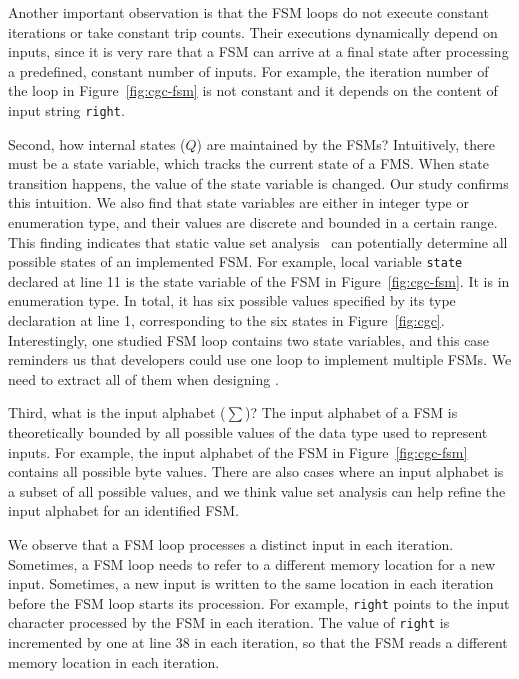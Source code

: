 Another important observation is that 
the FSM loops do not execute constant 
iterations or take constant trip counts.
Their executions dynamically depend on inputs, 
since it is very rare that a FSM can arrive at a final 
state after processing a predefined, constant number of inputs. 
For example, the iteration number of the 
loop in Figure~\ref{fig:cgc-fsm}
is not constant and it
depends on the content of input string \texttt{right}.

Second, how internal states ($Q$) are maintained by the FSMs?
Intuitively, there must be a state variable, which tracks the current state of a FMS.
When state transition happens, 
the value of the state variable is changed. 
Our study confirms this intuition. 
We also find that state variables are either in integer type or enumeration type,
and their values are discrete and bounded in a certain range. 
This finding indicates that static value set analysis~\cite{DEEPVSA,VSA} 
can potentially determine all possible states of an implemented FSM.
For example, local variable \texttt{state} declared at line 11
is the state variable of the FSM in Figure~\ref{fig:cgc-fsm}.
It is in enumeration type.
In total, it has six possible values 
specified by its type declaration at line 1, 
corresponding to the six states in Figure~\ref{fig:cgc}.
Interestingly, one studied FSM loop contains two state variables,
and this case reminders us that developers could use one loop 
to implement multiple FSMs. 
We need to extract all of them when designing \Tool{}.



Third, what is the input alphabet ($\sum$)? 
The input alphabet of a FSM is theoretically bounded by all possible values 
of the data type used to represent inputs. 
For example, the input alphabet of the FSM 
in Figure~\ref{fig:cgc-fsm} contains all possible byte values.
There are also cases where an input alphabet is a subset of all possible values, 
and we think value set analysis can help refine 
the input alphabet for an identified FSM.

We observe that a FSM loop processes a distinct input in each iteration. 
Sometimes, a FSM loop needs to refer to a different memory location for a new input. 
Sometimes, a new input is written to the same 
location in each iteration before the FSM loop starts its procession.    
For example, \texttt{right} points to the input character 
processed by the FSM in each iteration. 
The value of \texttt{right} is incremented by one at line 38 in each iteration, 
so that the FSM reads a different memory location in each iteration. 

